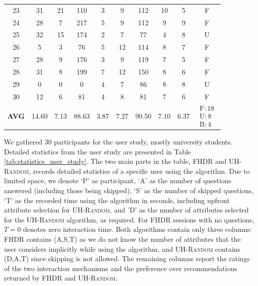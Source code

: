 \documentclass[conference]{IEEEtran}
\theoremstyle{definition}
\theoremstyle{plain}
\begin{document}
\begin{table}[t]
{\begin{tabular}{c|ccc|ccc|cc|c}
23 & 31 & 21 & 110 & 3 & 9  & 112 & 10 & 5  & F \\
24 & 28 & 7  & 217 & 5 & 9  & 112 & 9  & 9  & F \\
25 & 32 & 15 & 174 & 2 & 7  & 77  & 4  & 8  & U \\
26 & 5  & 3  & 76  & 5 & 12 & 114 & 8  & 7  & F \\
27 & 28 & 9  & 176 & 3 & 9  & 119 & 7  & 5  & F \\
28 & 31 & 8  & 199 & 7 & 12 & 150 & 8  & 6  & F \\
29 & 0  & 0  & 0   & 4 & 7  & 86  & 8  & 8  & U \\
30 & 12 & 6  & 81  & 4 & 8  & 81  & 7  & 6  & F \\

\midrule
\textbf{AVG}
& 14.60
& 7.13
& 88.63
& 3.87
& 7.27
& 90.50
& 7.10
& 6.37
& $\substack{\mathrm{F}:18\\\mathrm{U}:8\\\mathrm{B}:4}$ \\

\bottomrule
\end{tabular}
}
\end{table}

We gathered $30$ participants for the user study, mostly university students. Detailed statistics from the user study are presented in Table \ref{tab:statistics_user_study}. The two main parts in the table, \textsc{FHDR} and \textsc{UH-Random}, records detailed statistics of a specific user using the algorithm. Due to limited space, we denote `P' as participant, `A' as the number of questions answered (including those being skipped), `S' as the number of skipped questions, `T' as the recorded time using the algorithm in seconds, including upfront attribute selection for \textsc{UH-Random}, and 'D' as the number of attributes selected for the \textsc{UH-Random} algorithm, as required. For FHDR sessions with no questions, $T=0$ denotes zero interaction time. Both algorithms contain only three columns: \textsc{FHDR} contains (A,S,T) as we do not know the number of attributes that the user considers implicitly while using the algorithm, and \textsc{UH-Random} contains (D,A,T) since skipping is not allowed. The remaining columns report the ratings of the two interaction mechanisms and the preference over recommendations returned by \textsc{FHDR} and \textsc{UH-Random}.
\end{document}
